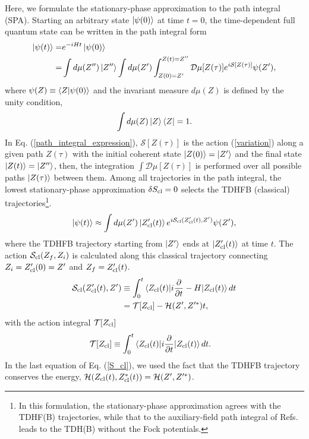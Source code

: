 \documentclass[11pt]{book} %
\begin{document}
Here, we formulate the stationary-phase approximation to the path integral (SPA). 
Starting an arbitrary state $\ket{\psi(0)}$ at time $t=0$,
the time-dependent full quantum state can be written in the path integral form
\begin{align}
\ket{\psi(t)}
	=& e^{-iHt} \ket{\psi(0)} \nonumber \\
	=& \int d\mu(Z'') \ket{Z''} \int d\mu(Z') \int_{Z(0)=Z'}^{Z(t)=Z''} \mathcal{D}\mu[Z(\tau)]
	e^{i\mathcal{S}[Z(\tau)]} \psi(Z') ,
\label{path_integral_expression}
\end{align}
where $\psi(Z)\equiv \braket{Z|\psi(0)}$ and
the invariant measure $d\mu(Z)$ is defined by 
the unity condition,
\begin{equation}
  \int d\mu(Z) \ket{Z}\bra{Z} = 1 .
  \label{unity}
\end{equation}
In Eq. (\ref{path_integral_expression}),
$\mathcal{S}[Z(\tau)]$ is the action (\ref{variation}) along a given path $Z(\tau)$
with the initial coherent state $\ket{Z(0)}=\ket{Z'}$ and
the final state $\ket{Z(t)}=\ket{Z''}$,
then, the integration $\int \mathcal {D}\mu[Z(\tau)]$
is performed over all possible paths $\ket{Z(\tau)}$ between them.
Among all trajectories in the path integral,
the lowest stationary-phase approximation $\delta S_{\rm cl}=0$ selects
the TDHFB (classical) trajectories\footnote{
In this formulation, the stationary-phase approximation agrees with
the TDHF(B) trajectories, while that to the auxiliary-field path
integral of Refs. \cite{Neg82,L80}
leads to the TDH(B) without the Fock potentials.
}.
\begin{equation}
	\ket{\psi(t)} \approx \int d\mu(Z') \ket{Z'_{\rm cl}(t)}
	e^{i\mathcal{S}_{\rm cl}(Z'_{\rm cl}(t),Z')} \psi(Z') ,
\end{equation}
where the TDHFB trajectory starting from $\ket{Z'}$
ends at $\ket{Z'_{\rm cl}(t)}$ at time $t$.
The action $\mathcal{S}_{\rm cl}(Z_f,Z_i)$ is calculated along this
classical trajectory
connecting $Z_i=Z'_{\rm cl}(0)=Z'$ and $Z_f=Z'_{\rm cl}(t)$.
\begin{align}
	\mathcal{S}_{\rm cl}(Z'_{\rm cl}(t),Z') &\equiv \int_{0}^{t}
\braket{Z_{\rm cl}(t)|
	i\frac{\partial}{\partial t} - H
	|Z_{\rm cl}(t)} dt \nonumber \\
	&= \mathcal{T}[Z_{\rm cl}] - \mathcal{H}(Z',Z'^*) t 
	,
	\label{S_cl}
\end{align}
with the action integral $\mathcal{T}[Z_{\rm cl}]$
\begin{align}
\mathcal{T}[Z_{\rm cl}] &\equiv
\int_{0}^{t} \braket{Z_{\rm cl}(t)| i\frac{\partial}{\partial t}
	|Z_{\rm cl}(t)} dt  .
\end{align}
In the last equation of Eq. (\ref{S_cl}),
we used the fact that the TDHFB trajectory conserves the energy,
$\mathcal{H}(Z_{\rm cl}(t),Z_{\rm cl}^*(t))= \mathcal{H}(Z',Z'^*)$.
\end{document}
